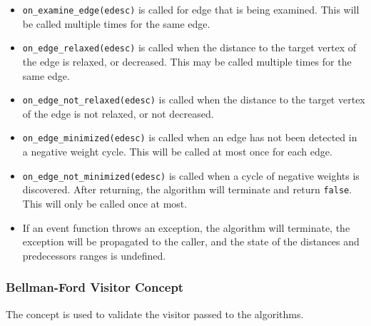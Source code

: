 \begin{itemdescr}
      \pnum\effects
            \begin{itemize}
                  \item
                        \lstinline{on_examine_edge(edesc)} is called for edge that is being examined. This will be called 
                        multiple times for the same edge.
                  \item
                        \lstinline{on_edge_relaxed(edesc)} is called when the distance to the target vertex of the edge
                        is relaxed, or decreased. This may be called multiple times for the same edge.
                  \item
                        \lstinline{on_edge_not_relaxed(edesc)} is called when the distance to the target vertex of the edge
                        is not relaxed, or not decreased.
                  \item
                        \lstinline{on_edge_minimized(edesc)} is called when an edge has not been detected in a negative 
                        weight cycle. This will be called at most once for each edge.
                  \item
                        \lstinline{on_edge_not_minimized(edesc)} is called when a cycle of negative weights is discovered.
                        After returning, the algorithm will terminate and return \lstinline{false}. This will only be called
                        once at most.
            \end{itemize}
      \pnum\throws 
            \begin{itemize}
                  \item If an event function throws an exception, the algorithm will terminate, the exception will 
                  be propagated to the caller, and the state of the distances and predecessors ranges is undefined.
            \end{itemize}
\end{itemdescr}

\subsubsection{Bellman-Ford Visitor Concept}

The  concept is used to validate the visitor passed to the algorithms.

